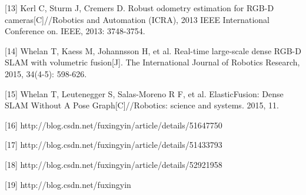 [13] Kerl C, Sturm J, Cremers D. Robust odometry estimation for RGB-D cameras[C]//Robotics and Automation (ICRA), 2013 IEEE International Conference on. IEEE, 2013: 3748-3754. 

[14] Whelan T, Kaess M, Johannsson H, et al. Real-time large-scale dense RGB-D SLAM with volumetric fusion[J]. The International Journal of Robotics Research, 2015, 34(4-5): 598-626. 

[15] Whelan T, Leutenegger S, Salas-Moreno R F, et al. ElasticFusion: Dense SLAM Without A Pose Graph[C]//Robotics: science and systems. 2015, 11. 

[16] http://blog.csdn.net/fuxingyin/article/details/51647750 

[17] http://blog.csdn.net/fuxingyin/article/details/51433793 

[18] http://blog.csdn.net/fuxingyin/article/details/52921958 

[19] http://blog.csdn.net/fuxingyin
